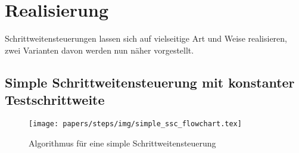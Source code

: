 %
%
%
\section{Realisierung
\label{steps:section:loesung}}
Schrittweitensteuerungen lassen sich auf vielseitige Art und Weise realisieren,
zwei Varianten davon werden nun näher vorgestellt.

\subsection{Simple Schrittweitensteuerung mit konstanter Testschrittweite
\label{steps:subsection:simplestep}}
\begin{figure}
  \centering
  \texttt{[image: papers/steps/img/simple\_ssc\_flowchart.tex]}
  \caption{Algorithmus für eine simple Schrittweitensteuerung
    \label{buch:steps:flowchartSimple}}
\end{figure}

